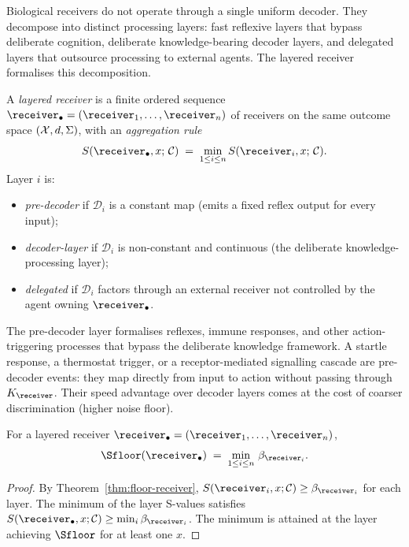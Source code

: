 Biological receivers do not operate through a single uniform decoder. They decompose into distinct processing layers: fast reflexive layers that bypass deliberate cognition, deliberate knowledge-bearing decoder layers, and delegated layers that outsource processing to external agents. The layered receiver formalises this decomposition.

\begin{definition}\label{def:layered}
A \emph{layered receiver} is a finite ordered sequence $\receiver_\bullet = (\receiver_1, \ldots, \receiver_n)$ of receivers on the same outcome space $(\mathcal{X}, d, \Sigma)$, with an \emph{aggregation rule}
\[
S(\receiver_\bullet, x;\, \Cell) \;=\; \min_{1 \leq i \leq n} S(\receiver_i, x;\, \Cell).
\]
Layer $i$ is:
\begin{itemize}[nosep]
  \item \emph{pre-decoder} if $\mathcal{D}_i$ is a constant map (emits a fixed reflex output for every input);
  \item \emph{decoder-layer} if $\mathcal{D}_i$ is non-constant and continuous (the deliberate knowledge-processing layer);
  \item \emph{delegated} if $\mathcal{D}_i$ factors through an external receiver not controlled by the agent owning $\receiver_\bullet$.
\end{itemize}
\end{definition}

\begin{remark}\label{rem:reflex}
The pre-decoder layer formalises reflexes, immune responses, and other action-triggering processes that bypass the deliberate knowledge framework. A startle response, a thermostat trigger, or a receptor-mediated signalling cascade are pre-decoder events: they map directly from input to action without passing through $K_\receiver$. Their speed advantage over decoder layers comes at the cost of coarser discrimination (higher noise floor).
\end{remark}

\begin{proposition}\label{prop:layered-floor}
For a layered receiver $\receiver_\bullet = (\receiver_1, \ldots, \receiver_n)$,
\[
\Sfloor(\receiver_\bullet) \;=\; \min_{1 \leq i \leq n}\, \NoiseFloor_{\receiver_i}.
\]
\end{proposition}

\begin{proof}
By Theorem~\ref{thm:floor-receiver}, $S(\receiver_i, x; \Cell) \geq \NoiseFloor_{\receiver_i}$ for each layer. The minimum of the layer S-values satisfies $S(\receiver_\bullet, x; \Cell) \geq \min_i \NoiseFloor_{\receiver_i}$. The minimum is attained at the layer achieving $\Sfloor$ for at least one $x$.
\end{proof}

